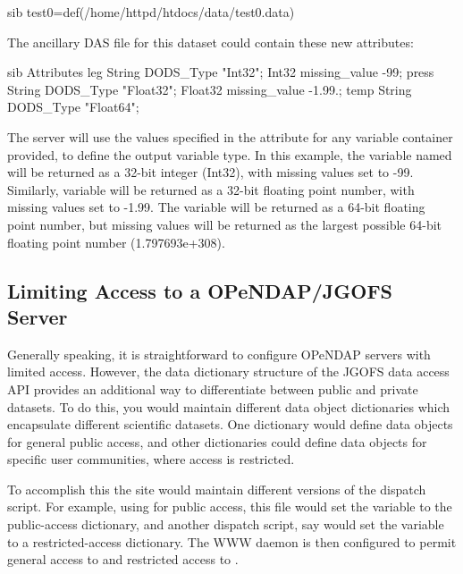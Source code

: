 \documentclass{dods-book}
\begin{document}
\begin{vcode}{sib}
test0=def(/home/httpd/htdocs/data/test0.data)  
\end{vcode}

The ancillary DAS file for this dataset could contain these new attributes:

\begin{vcode}{sib}
Attributes {
    leg {
        String DODS_Type "Int32";
        Int32 missing_value -99;
    }
    press {
        String DODS_Type "Float32"; 
        Float32 missing_value -1.99.;
    }
    temp {
        String DODS_Type "Float64";
    }
}
\end{vcode}

The server will use the values specified in the 
attribute for any variable container provided, to define the output
variable type. In this example, the variable named  will be
returned as a 32-bit integer (Int32), with missing values set to -99.
Similarly, variable  will be returned as a 32-bit floating
point number, with missing values set to -1.99. The variable
 will be returned as a 64-bit floating point number, but
missing values will be returned as the largest possible 64-bit
floating point number (1.797693e+308).

\subsection{Limiting Access to a OPeNDAP/JGOFS Server}

Generally speaking, it is straightforward to configure OPeNDAP servers
with limited access.  However, the data dictionary structure of the JGOFS
data access API provides an additional way to differentiate between public
and private datasets. To do this, you would maintain different data
object dictionaries which encapsulate different scientific datasets.
One dictionary would define data objects for general public access,
and other dictionaries could define data objects for specific user
communities, where access is restricted.
     
To accomplish this the site would maintain different versions of the
 dispatch script. For example, using  for
public access, this file would set the  variable to
the public-access dictionary, and another dispatch script, say
 would set the  variable to a
restricted-access dictionary. The WWW daemon is then configured to
permit general access to  and restricted access to
.
\end{document}

